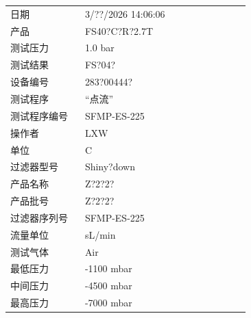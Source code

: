 \documentclass[UTF8,10pt,a4paper,fontset=fandol]{ctexart}
\newcommand{\fieldvalue}[1]{#1}
\begin{document}
\begin{tabular}{@{}p{0.28\linewidth}p{0.62\linewidth}@{}}
日期 &
\fieldvalue{3/??/2026 14:06:06} \\[2pt]

产品 &
\fieldvalue{FS40?C?R?2.7T} \\[2pt]

测试压力 &
\fieldvalue{1.0 bar} \\[2pt]

测试结果 &
\fieldvalue{FS?04?} \\[2pt]

设备编号 &
\fieldvalue{283?00444?} \\[2pt]

测试程序 &
\fieldvalue{“点流”} \\[2pt]

测试程序编号 &
\fieldvalue{SFMP-ES-225} \\[2pt]

操作者 &
\fieldvalue{LXW} \\[2pt]

单位 &
\fieldvalue{C} \\[2pt]

过滤器型号 &
\fieldvalue{Shiny?down} \\[2pt]

产品名称 &
\fieldvalue{Z?2?2?} \\[2pt]

产品批号 &
\fieldvalue{Z?2?2?} \\[2pt]

过滤器序列号 &
\fieldvalue{SFMP-ES-225} \\[2pt]

流量单位 &
\fieldvalue{sL/min} \\[2pt]

测试气体 &
\fieldvalue{Air} \\[2pt]

最低压力 &
\fieldvalue{-1100 mbar} \\[2pt]

中间压力 &
\fieldvalue{-4500 mbar} \\[2pt]

最高压力 &
\fieldvalue{-7000 mbar} \\
\end{tabular}
\end{document}

